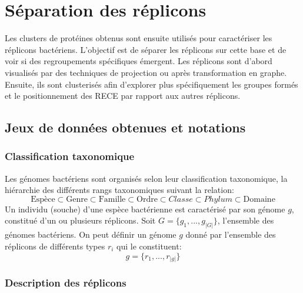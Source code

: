 \newpage
\chapter{Séparation des réplicons}\label{chap4b}

\label{parclassifrepl}

Les clusters de protéines obtenus sont ensuite utilisés pour caractériser les réplicons bactériens. L'objectif est de séparer les réplicons sur cette base et de voir si des regroupements spécifiques émergent. Les réplicons sont d'abord visualisés par des techniques de projection ou après transformation en graphe. Ensuite, ils sont clusterisés afin d'explorer plus spécifiquement les groupes formés et le positionnement des RECE par rapport aux autres réplicons.

\section{Jeux de données obtenues et notations}\label{parjeuxdedonnees}
    
\subsection{Classification taxonomique}

Les génomes bactériens sont organisés  selon leur classification taxonomique, la hiérarchie des différents rangs taxonomiques suivant la relation:
	\begin{equation}\label{eqtax}
	\text{Espèce} \subset \text{Genre} \subset \text{Famille} \subset \text{Ordre} \subset{Classe} \subset {Phylum} \subset \text{Domaine}
	\end{equation}
Un individu (souche) d'une espèce bactérienne est caractérisé par son génome $g$, constitué d’un ou plusieurs réplicons. Soit $G=\{g_{1},...,g_{|G|}\}$, l'ensemble des génomes bactériens. On peut définir un génome $g$ donné par l'ensemble des réplicons de différents types $r_{i}$ qui le constituent:
	\begin{equation}\label{eqindiv}
	g= \{r_{1},...,r_{|g|}\}
	\end{equation} 

\subsection{Description des réplicons}


